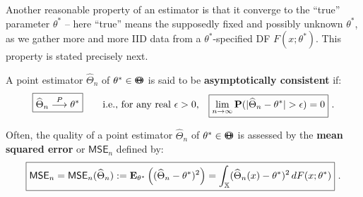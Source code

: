 Another reasonable property of an estimator is that it converge to the ``true'' parameter $\theta^*$ -- here ``true'' means the supposedly fixed and possibly unknown $\theta^*$, as we gather more and more IID data from a $\theta^*$-specified DF $F(x; \theta^*)$.  This property is stated precisely next.
\begin{definition}\label{D:Consistency}
A point estimator $\widehat{\Theta}_n$ of $\theta^* \in {\Theta}\mspace{-11 mu}{\Theta}$ is said to be {\bf asymptotically consistent} if:
\[
\boxed{
\widehat{\Theta}_n \overset{P}{\longrightarrow} \theta^*
} \qquad \text{i.e., for any real $\epsilon > 0$,} \quad
\boxed{
\lim_{n \to \infty} \mathbf{P} (| \widehat{\Theta}_n - \theta^* | > \epsilon) = 0
} \ .
\]
\end{definition}

\begin{definition}\label{D:MSE}
Often, the quality of a point estimator $\widehat{\Theta}_n$ of $\theta^* \in {\Theta}\mspace{-11 mu}{\Theta}$ is assessed by the {\bf mean squared error} or $\mathsf{MSE}_n$ defined by:
\begin{equation}\label{E:MSE}
\boxed{
\mathsf{MSE}_n=\mathsf{MSE}_n(\widehat{\Theta}_n) := \mathbf{E}_{\theta^*} \left((\widehat{\Theta}_n-\theta^*)^2 \right) 
= \int_{\mathbb{X}} (\widehat{\Theta}_n(x)-\theta^*)^2 \, dF(x;\theta^*) 
} \ .
\end{equation}
\end{definition}

